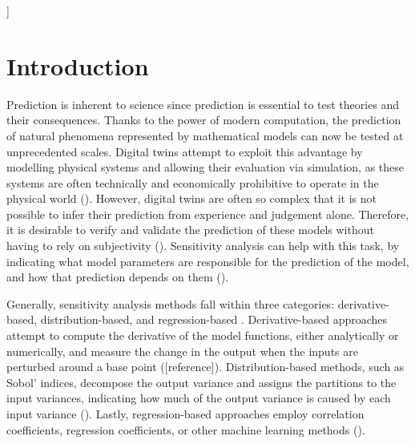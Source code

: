 \documentclass[twocolumn]{rps-esrel2022}
\begin{document}

]

\section{Introduction}

Prediction is inherent to science since prediction is essential to test theories and their consequences.
Thanks to the power of modern computation, the prediction of natural phenomena represented by mathematical models can now be tested at unprecedented scales.
Digital twins attempt to exploit this advantage by modelling physical systems and allowing their evaluation via simulation, as these systems are often technically and
economically prohibitive to operate in the physical world (\cite{wagg2020digital}).
However, digital twins are often so complex that it is not possible to infer their prediction from experience and judgement alone.
Therefore, it is desirable to verify and validate the prediction of these models without having to rely on subjectivity (\cite{JRC122132}).
Sensitivity analysis can help with this task, by indicating what model parameters are responsible for the prediction of the model, and how
that prediction depends on them (\cite{saltelli2004sensitivity}).

Generally, sensitivity analysis methods fall within three categories: derivative-based, distribution-based, and regression-based \cite{razavi2021future}.
Derivative-based approaches attempt to compute the derivative of the model functions, either analytically or numerically, and measure the change in
the output when the inputs are perturbed around a base point ([reference]).
Distribution-based methods, such as Sobol' indices, decompose the output variance and assigns the partitions to the input variances, indicating how much
of the output variance is caused by each input variance (\cite{saltelli2010variance}).
Lastly, regression-based approaches employ correlation coefficients, regression coefficients, or other machine learning methods (\cite{sudret2008global}).
\end{document}
